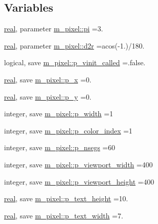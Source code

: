 \subsection*{Variables}
\begin{DoxyCompactItemize}
\item 
\hyperlink{read__watch_83_8txt_abdb62bde002f38ef75f810d3a905a823}{real}, parameter \hyperlink{namespacem__pixel_a2ff737e84d07f927bac2deb1801428a2}{m\+\_\+pixel\+::pi} =3.
\item 
\hyperlink{read__watch_83_8txt_abdb62bde002f38ef75f810d3a905a823}{real}, parameter \hyperlink{namespacem__pixel_a452fdfdc5c2570a301103fcb181cfb7d}{m\+\_\+pixel\+::d2r} =acos(-\/1.)/180.
\item 
logical, save \hyperlink{namespacem__pixel_a5205a23825feacbc005215adc889a710}{m\+\_\+pixel\+::p\+\_\+vinit\+\_\+called} =.false.
\item 
\hyperlink{read__watch_83_8txt_abdb62bde002f38ef75f810d3a905a823}{real}, save \hyperlink{namespacem__pixel_a983dc4bc4ea45266ee8b5100367bedee}{m\+\_\+pixel\+::p\+\_\+x} =0.
\item 
\hyperlink{read__watch_83_8txt_abdb62bde002f38ef75f810d3a905a823}{real}, save \hyperlink{namespacem__pixel_a8bda60db9b6c7c2402e1e12a44bc36aa}{m\+\_\+pixel\+::p\+\_\+y} =0.
\item 
integer, save \hyperlink{namespacem__pixel_a0ccc9f9102afdf3b469b3d2cab22aec9}{m\+\_\+pixel\+::p\+\_\+width} =1
\item 
integer, save \hyperlink{namespacem__pixel_af37b7b3481f3876270e99200e2554b9f}{m\+\_\+pixel\+::p\+\_\+color\+\_\+index} =1
\item 
integer, save \hyperlink{namespacem__pixel_ace7c28c9ae8a890cac3c7fc2d3c2e824}{m\+\_\+pixel\+::p\+\_\+nsegs} =60
\item 
integer, save \hyperlink{namespacem__pixel_adaf071a7cca5f7d4404d59c17739fcf3}{m\+\_\+pixel\+::p\+\_\+viewport\+\_\+width} =400
\item 
integer, save \hyperlink{namespacem__pixel_acf14b658781bda49f8d06960898145e1}{m\+\_\+pixel\+::p\+\_\+viewport\+\_\+height} =400
\item 
\hyperlink{read__watch_83_8txt_abdb62bde002f38ef75f810d3a905a823}{real}, save \hyperlink{namespacem__pixel_a537c6094f5f61e3244c7e380824f303e}{m\+\_\+pixel\+::p\+\_\+text\+\_\+height} =10.
\item 
\hyperlink{read__watch_83_8txt_abdb62bde002f38ef75f810d3a905a823}{real}, save \hyperlink{namespacem__pixel_adc146e2cd2855f33422e2c11ca1ba7ce}{m\+\_\+pixel\+::p\+\_\+text\+\_\+width} =7.

\end{DoxyCompactItemize}
